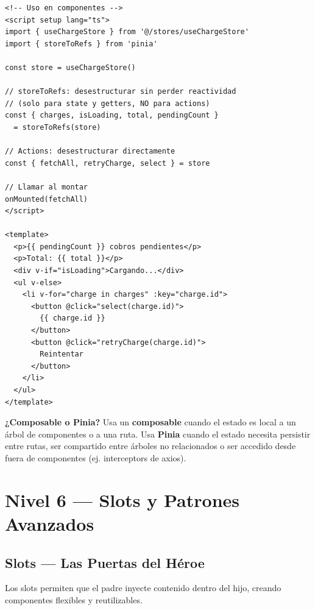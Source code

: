 \documentclass[11pt,a4paper]{article}
\begin{document}
\begin{pergamino}
\begin{lstlisting}[style=vue]
<!-- Uso en componentes -->
<script setup lang="ts">
import { useChargeStore } from '@/stores/useChargeStore'
import { storeToRefs } from 'pinia'

const store = useChargeStore()

// storeToRefs: desestructurar sin perder reactividad
// (solo para state y getters, NO para actions)
const { charges, isLoading, total, pendingCount }
  = storeToRefs(store)

// Actions: desestructurar directamente
const { fetchAll, retryCharge, select } = store

// Llamar al montar
onMounted(fetchAll)
</script>

<template>
  <p>{{ pendingCount }} cobros pendientes</p>
  <p>Total: {{ total }}</p>
  <div v-if="isLoading">Cargando...</div>
  <ul v-else>
    <li v-for="charge in charges" :key="charge.id">
      <button @click="select(charge.id)">
        {{ charge.id }}
      </button>
      <button @click="retryCharge(charge.id)">
        Reintentar
      </button>
    </li>
  </ul>
</template>
\end{lstlisting}
\end{pergamino}

\begin{cofre}
\textbf{¿Composable o Pinia?}
Usa un \textbf{composable} cuando el estado es local a un árbol de
componentes o a una ruta. Usa \textbf{Pinia} cuando el estado necesita
persistir entre rutas, ser compartido entre árboles no relacionados
o ser accedido desde fuera de componentes (ej. interceptors de axios).
\end{cofre}

\section{Nivel 6 — Slots y Patrones Avanzados}

\subsection{Slots — Las Puertas del Héroe}

Los slots permiten que el padre inyecte contenido dentro del hijo,
creando componentes flexibles y reutilizables.
\end{document}
